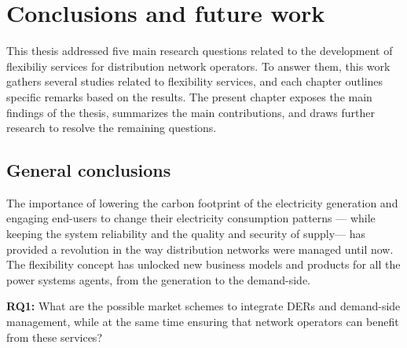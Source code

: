 
\chapter{Conclusions and future work}
\label{conclus}
   This thesis addressed five main research questions related to the development of flexibiliy services for distribution network operators. To answer them, this work gathers several studies related to flexibility services, and each chapter outlines specific remarks based on the results. The present chapter exposes the main findings of the thesis, summarizes the main contributions, and draws further research to resolve the remaining questions. 

\section{General conclusions}
The importance of lowering the carbon footprint of the electricity generation and engaging end-users to change their electricity consumption patterns --- while keeping the system reliability and the quality and security of supply--- has provided a revolution in the way distribution networks were managed until now. The flexibility concept has unlocked new business models and products for all the power systems agents, from the generation to the demand-side.


\begin{tcolorbox}
\textbf{RQ1:} What are the possible market schemes to integrate DERs and demand-side management, while at the same time ensuring that network operators can benefit from these services?  
\end{tcolorbox}


